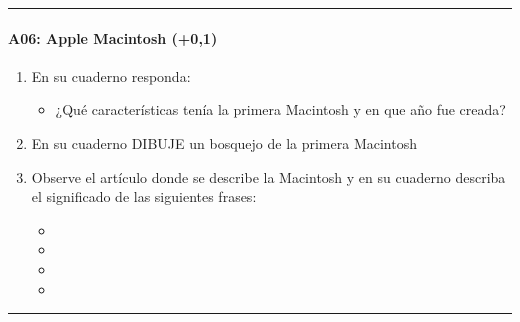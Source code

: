 \documentclass[letterpaper,10pt,spanish]{sphinxmanual}
\begin{document}
\bigskip\hrule\bigskip



\paragraph{A06: Apple \sphinxhyphen{} Macintosh (+0,1)}
\label{\detokenize{cursos/informatica10/periodo01/G01:a06-apple-macintosh-0-1}}
\sphinxAtStartPar
{}
\begin{enumerate}
%
\item {} 
\sphinxAtStartPar
En su cuaderno responda:
\begin{itemize}
\item {} 
\sphinxAtStartPar
¿Qué características tenía la primera Macintosh y en que año fue creada?

\end{itemize}

\item {} 
\sphinxAtStartPar
En su cuaderno DIBUJE un bosquejo de la primera Macintosh

\item {} 
\sphinxAtStartPar
Observe el artículo donde se describe la Macintosh y en su cuaderno describa el significado de las siguientes frases:
\begin{itemize}
\item {} 
\sphinxAtStartPar
{}

\item {} 
\sphinxAtStartPar
{}

\item {} 
\sphinxAtStartPar
{}

\item {} 
\sphinxAtStartPar
{}

\end{itemize}

\end{enumerate}


\bigskip\hrule\bigskip
\end{document}
